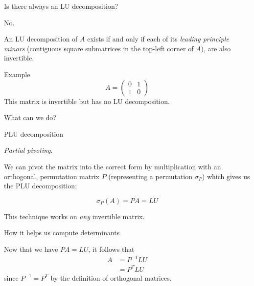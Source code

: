 \documentclass[handout]{beamer}
\begin{document}
\begin{frame}{Is there always an LU decomposition?}

    \alert{No.}

    An LU decomposition of $A$ exists if and only if each of its \emph{leading principle minors}
    (contiguous square submatrices in the top-left corner of $A$),
    are also invertible.

    \pause{}

    \begin{exampleblock}{Example}
        \[
           A= \begin{pmatrix}{}
                0 & 1 \\
                1 & 0
            \end{pmatrix}
        \]
        This matrix is invertible but has no LU decomposition.
    \end{exampleblock}

    \pause{}

    \begin{alertblock}{}
        What can we do?
    \end{alertblock}

\end{frame}

\begin{frame}{PLU decomposition}

    \emph{Partial pivoting}.

    We can pivot the matrix into the correct form by multiplication with
    an orthogonal, permutation matrix $P$ (representing a permutation $\sigma_P$)
    which gives us the PLU decomposition:

    \[
        \sigma_P(A) = PA = LU
    \]

    \pause{}

    \begin{block}{}
        This technique works on \emph{any} invertible matrix.
    \end{block}

\end{frame}

\begin{frame}{How it helps us compute determinants}

    Now that we have $PA = LU$, it follows that
    \begin{align*}
        A &= P^{-1}LU \\
          &= P^T LU
    \end{align*}
    since $P^{-1} = P^T$ by the definition of orthogonal matrices.

\end{frame}
\end{document}
